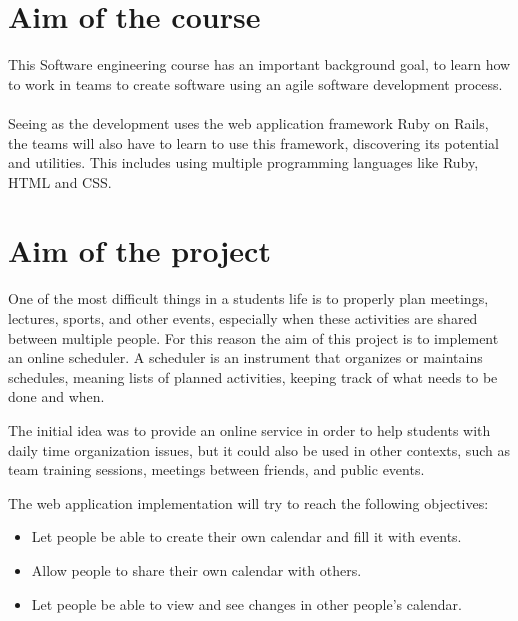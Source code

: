 
\label{Introduction}

\section{Aim of the course}
\vspace{-5mm}
This Software engineering course has an important background goal, to learn how to work in teams to create software using an agile software development process.\\ \\
Seeing as the development uses the web application framework Ruby on Rails, the teams will also have to learn to use this framework, discovering its potential and utilities. This includes using multiple programming languages like Ruby, HTML and CSS.

\section{Aim of the project}
\vspace{-5mm}
One of the most difficult things in a students life is to properly plan meetings, lectures, sports, and other events, especially when these activities are shared between multiple people. For this reason the aim of this project is to implement an online scheduler. A scheduler is an instrument that organizes or maintains schedules, meaning lists of planned activities, keeping track of what needs to be done and when.

The initial idea was to provide an online service in order to help students with daily time organization issues, but it could also be used in other contexts, such as team training sessions, meetings between friends, and public events.

The web application implementation will try to reach the following objectives:
\vspace{-5mm}
\begin{itemize}
	\setlength{\itemsep}{-5pt}
	\item Let people be able to create their own calendar and fill it with events.
	\item Allow people to share their own calendar with others.
	\item Let people be able to view and see changes in other people's calendar.
\end{itemize}